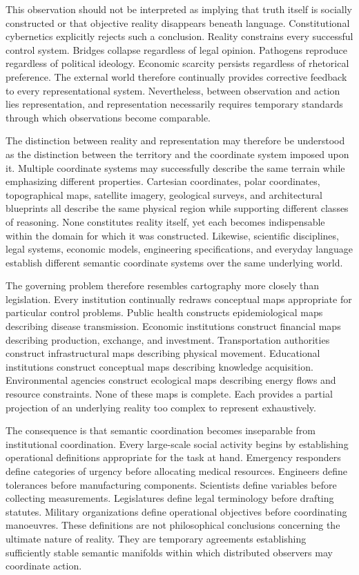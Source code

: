 \documentclass[12pt,a4paper]{article}
\begin{document}
This observation should not be interpreted as implying that truth itself is socially constructed or that objective reality disappears beneath language. Constitutional cybernetics explicitly rejects such a conclusion. Reality constrains every successful control system. Bridges collapse regardless of legal opinion. Pathogens reproduce regardless of political ideology. Economic scarcity persists regardless of rhetorical preference. The external world therefore continually provides corrective feedback to every representational system. Nevertheless, between observation and action lies representation, and representation necessarily requires temporary standards through which observations become comparable.

The distinction between reality and representation may therefore be understood as the distinction between the territory and the coordinate system imposed upon it. Multiple coordinate systems may successfully describe the same terrain while emphasizing different properties. Cartesian coordinates, polar coordinates, topographical maps, satellite imagery, geological surveys, and architectural blueprints all describe the same physical region while supporting different classes of reasoning. None constitutes reality itself, yet each becomes indispensable within the domain for which it was constructed. Likewise, scientific disciplines, legal systems, economic models, engineering specifications, and everyday language establish different semantic coordinate systems over the same underlying world.

The governing problem therefore resembles cartography more closely than legislation. Every institution continually redraws conceptual maps appropriate for particular control problems. Public health constructs epidemiological maps describing disease transmission. Economic institutions construct financial maps describing production, exchange, and investment. Transportation authorities construct infrastructural maps describing physical movement. Educational institutions construct conceptual maps describing knowledge acquisition. Environmental agencies construct ecological maps describing energy flows and resource constraints. None of these maps is complete. Each provides a partial projection of an underlying reality too complex to represent exhaustively.

The consequence is that semantic coordination becomes inseparable from institutional coordination. Every large-scale social activity begins by establishing operational definitions appropriate for the task at hand. Emergency responders define categories of urgency before allocating medical resources. Engineers define tolerances before manufacturing components. Scientists define variables before collecting measurements. Legislatures define legal terminology before drafting statutes. Military organizations define operational objectives before coordinating manoeuvres. These definitions are not philosophical conclusions concerning the ultimate nature of reality. They are temporary agreements establishing sufficiently stable semantic manifolds within which distributed observers may coordinate action.
\end{document}
